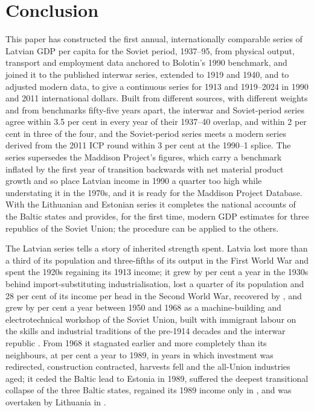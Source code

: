 \section{Conclusion}
\label{sec:conclusion}

This paper has constructed the first annual, internationally comparable series of Latvian GDP per capita for the Soviet period, 1937--95, from physical output, transport and employment data anchored to Bolotin's 1990 benchmark, and joined it to the published interwar series, extended to 1919 and 1940, and to adjusted modern data, to give a continuous series for 1913 and 1919--2024 in 1990 and 2011 international dollars. Built from different sources, with different weights and from benchmarks fifty-five years apart, the interwar and Soviet-period series agree within 3.5 per cent in every year of their 1937--40 overlap, and within 2 per cent in three of the four, and the Soviet-period series meets a modern series derived from the 2011 ICP round within 3 per cent at the 1990--1 splice. The series supersedes the Maddison Project's figures, which carry a benchmark inflated by the first year of transition backwards with net material product growth and so place Latvian income in 1990 a quarter too high while understating it in the 1970s, and it is ready for the Maddison Project Database. With the Lithuanian and Estonian series it completes the national accounts of the Baltic states and provides, for the first time, modern GDP estimates for three republics of the Soviet Union; the procedure can be applied to the others.

The Latvian series tells a story of inherited strength spent. Latvia lost more than a third of its population and three-fifths of its output in the First World War and spent the 1920s regaining its 1913 income; it grew by  per cent a year in the 1930s behind import-substituting industrialisation, lost a quarter of its population and 28 per cent of its income per head in the Second World War, recovered by \lvREGAINthirtyeight{}, and grew by  per cent a year between 1950 and 1968 as a machine-building and electrotechnical workshop of the Soviet Union, built with immigrant labour on the skills and industrial traditions of the pre-1914 decades and the interwar republic \parencites[115--16]{vaskela_2013_lietuvos}[184]{years_of_dependence}[42--3]{puur_2019_turbulent}. From 1968 it stagnated earlier and more completely than its neighbours, at  per cent a year to 1989, in years in which investment was redirected, construction contracted, harvests fell and the all-Union industries aged; it ceded the Baltic lead to Estonia in 1989, suffered the deepest transitional collapse of the three Baltic states, regained its 1989 income only in \lvREGAINeightynine{}, and was overtaken by Lithuania in \ltOVERTAKElv{}.

